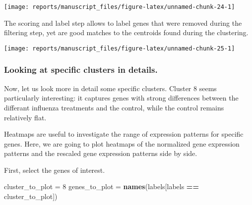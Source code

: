 \documentclass[9pt,a4paper,]{extarticle}
\newenvironment{Shaded}{\begin{snugshade}}{\end{snugshade}}
\newcommand{\DecValTok}[1]{\textcolor[rgb]{0.00,0.00,0.81}{#1}}
\newcommand{\KeywordTok}[1]{\textcolor[rgb]{0.13,0.29,0.53}{\textbf{#1}}}
\newcommand{\NormalTok}[1]{#1}
\newcommand{\OperatorTok}[1]{\textcolor[rgb]{0.81,0.36,0.00}{\textbf{#1}}}
\newcommand{\StringTok}[1]{\textcolor[rgb]{0.31,0.60,0.02}{#1}}
\begin{document}
\begin{center}\texttt{[image: reports/manuscript\_files/figure-latex/unnamed-chunk-24-1]} \end{center}

The scoring and label step allows to label genes that were removed during the
filtering step, yet are good matches to the centroids found during the
clustering.

\begin{center}\texttt{[image: reports/manuscript\_files/figure-latex/unnamed-chunk-25-1]} \end{center}

\hypertarget{looking-at-specific-clusters-in-details.}{%
\subsubsection{Looking at specific clusters in details.}\label{looking-at-specific-clusters-in-details.}}

Now, let us look more in detail some specific clusters. Cluster 8 seems
particularly interesting: it captures genes with strong differences between
the differant influenza treatments and the control, while the control remains
relatively flat.

Heatmaps are useful to investigate the range of expression patterns for
specific genes. Here, we are going to plot heatmaps of the normalized gene
expression patterns and the rescaled gene expression patterns side by side.

First, select the genes of interest.

\begin{Shaded}
\begin{Highlighting}[]
\NormalTok{cluster_to_plot =}\StringTok{ }\DecValTok{8}
\NormalTok{genes_to_plot =}\StringTok{  }\KeywordTok{names}\NormalTok{(labels[labels }\OperatorTok{==}\StringTok{ }\NormalTok{cluster_to_plot])}
\end{Highlighting}
\end{Shaded}
\end{document}
